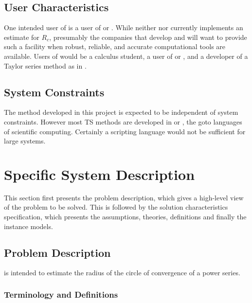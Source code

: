 \documentclass[12pt]{article}
\begin{document}
\subsection{User Characteristics} \label{SecUserCharacteristics}
\label{sc:SecUserCharacteristics}

One intended user of  is a user of \maple or \matlab. While
neither \matlab nor \maple currently implements an estimate for $R_c$,
presumably the companies that develop \matlab and \maple will want
to provide such a facility when robust, reliable, and accurate computational
tools are available.
Users of  would be a calculus student, a user of \maple or \matlab, and a
developer of a Taylor series method as in .

\subsection{System Constraints}

The method developed in this project is expected to be independent of system constraints. However
most TS methods are developed in \cpp or \fortran, the goto languages of scientific computing.
Certainly a scripting language would not be sufficient for large systems.

\section{Specific System Description} \label{sc:specific-system-description}

This section first presents the problem description, which gives a high-level
view of the problem to be solved.  This is followed by the solution characteristics
specification, which presents the assumptions, theories, definitions and finally
the instance models.

\subsection{Problem Description} \label{Sec_pd}

 is intended to estimate the radius of the circle of convergence of a power series.

\subsubsection{Terminology and  Definitions}\label{ssc:terminology-definitions}
\end{document}
